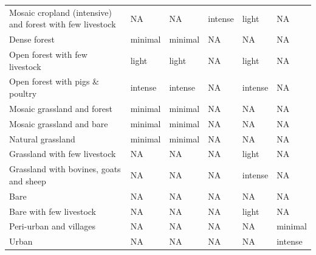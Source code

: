 \begin{table}[htb]
\begin{tabularx}{1\textwidth}{Ylllll}
Mosaic cropland (intensive) and forest with few livestock & NA & NA & intense & light & NA \\
Dense forest & minimal & minimal & NA & NA & NA \\
Open forest with few livestock & light & light & NA & light & NA \\
Open forest with pigs \& poultry & intense & intense & NA & intense & NA \\
Mosaic grassland and forest & minimal & minimal & NA & NA & NA \\
Mosaic grassland and bare & minimal & minimal & NA & NA & NA \\
Natural grassland & minimal & minimal & NA & NA & NA \\
Grassland with few livestock & NA & NA & NA & light & NA \\
Grassland with bovines, goats and sheep & NA & NA & NA & intense & NA \\
Bare & NA & NA & NA & NA & NA \\
Bare with few livestock & NA & NA & NA & light & NA \\
Peri-urban and villages & NA & NA & NA & NA & minimal \\
Urban & NA & NA & NA & NA & intense \\
\bottomrule
\end{tabularx}
\end{table}

